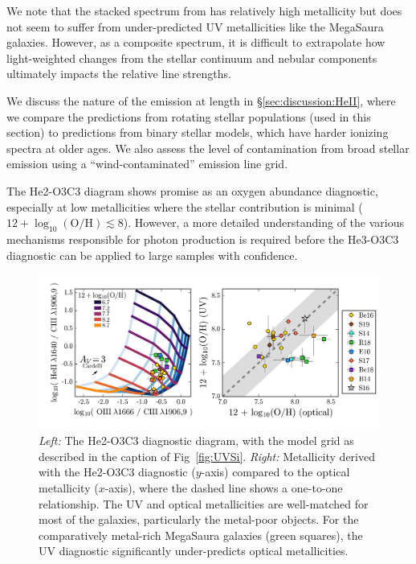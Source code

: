 \documentclass[trackchanges, preprint2]{aastex62}
\newcommand{\logten}{\ensuremath{\log_{10}}}
\newcommand{\logOH}{\ensuremath{\logten (\mathrm{O}/\mathrm{H})}\xspace}
\newcommand{\mage}{{\sc Meg}a{\sc S}a{\sc ura}\xspace}
\begin{document}
We note that the stacked spectrum from \citet{Steidel+2016} has relatively high metallicity but does not seem to suffer from under-predicted UV metallicities like the \mage galaxies. However, as a composite spectrum, it is difficult to extrapolate how light-weighted changes from the stellar continuum and nebular components ultimately impacts the relative line strengths.

We discuss the nature of the  emission at length in \S\ref{sec:discussion:HeII}, where we compare the predictions from rotating stellar populations (used in this section) to predictions from binary stellar models, which have harder ionizing spectra at older ages. We also assess the level of contamination from broad stellar emission using a ``wind-contaminated'' emission line grid.

The He2-O3C3 diagram shows promise as an oxygen abundance diagnostic, especially at low metallicities where the stellar contribution is minimal ($12+\logOH \lesssim 8$). However, a more detailed understanding of the various mechanisms responsible for  photon production is required before the He3-O3C3 diagnostic can be applied to large samples with confidence.

\begin{figure}
  \begin{center}
    \includegraphics[width=\linewidth]{figs/f4.png}
    \caption{\emph{Left:} The He2-O3C3 diagnostic diagram, with the model grid as described in the caption of Fig~\ref{fig:UVSi}. \emph{Right:} Metallicity derived with the He2-O3C3 diagnostic ($y$-axis) compared to the optical metallicity ($x$-axis), where the dashed line shows a one-to-one relationship. The UV and optical metallicities are well-matched for most of the galaxies, particularly the metal-poor objects. For the comparatively metal-rich \mage galaxies (green squares), the UV diagnostic significantly under-predicts optical metallicities.}
    \label{fig:UVHe}
  \end{center}
\end{figure}
\end{document}
